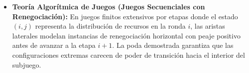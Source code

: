 \begin{itemize}
    \item \textbf{Teoría Algorítmica de Juegos (Juegos Secuenciales con Renegociación):} En juegos finitos extensivos por etapas donde el estado $(i,j)$ representa la distribución de recursos en la ronda $i$, las aristas laterales modelan instancias de renegociación horizontal con peaje positivo antes de avanzar a la etapa $i+1$. La poda demostrada garantiza que las configuraciones extremas carecen de poder de transición hacia el interior del subjuego.
\end{itemize}


